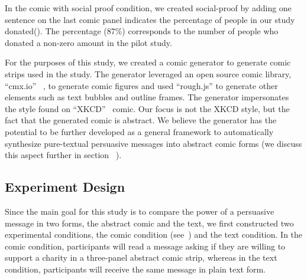 

In the comic with social proof condition, we created social-proof by adding one sentence on the last comic panel indicates the percentage of people in our study donated(). The percentage (87\%) corresponds to the number of people who donated a non-zero amount in the pilot study.


For the purposes of this study, we created a comic generator to generate comic strips used in the study. The generator leveraged an open source comic library, ``cmx.io'' ~\cite{cmx.io}, to generate comic figures and used ``rough.js'' \cite{rough.js} to generate other elements such as text bubbles and outline frames. The generator impersonates the style found on ``XKCD''~\cite{munroe2009xkcd} comic. Our focus is not the XKCD style, but the fact that the generated comic is abstract. We believe the generator has the potential to be further developed as a general framework to automatically synthesize pure-textual persuasive messages into abstract comic forms (we discuss this aspect further in section ~).



\subsection{Experiment Design}
\label{sub:Experiment Design}
Since the main goal for this study is to compare the power of a persuasive message in two forms, the abstract comic and the text, we first constructed two experimental conditions, the comic condition (see~) and the text condition. In the comic condition, participants will read a message asking if they are willing to support a charity in a three-panel abstract comic strip, whereas in the text condition, participants will receive the same message in plain text form. 

